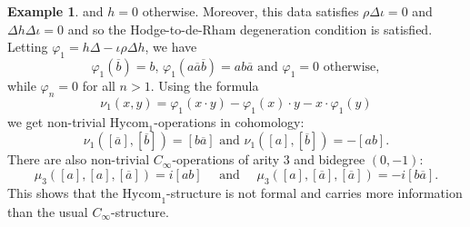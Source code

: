 \documentclass[a4paper]{amsart}
\theoremstyle{definition}
\newtheorem{exam}[theo]{Example}
\theoremstyle{theorem}
\newcommand{\ov}{\overline}
\newcommand{\Hycom}{{\mathrm{Hycom}}}
\begin{document}
\begin{exam}
 and $h=0$ otherwise.
Moreover, this data satisfies $\rho\Delta\iota=0$ and $\Delta h \Delta \iota=0$ and so the Hodge-to-de-Rham degeneration condition is satisfied.
Letting $\varphi_1=h\Delta-\iota\rho\Delta h$, we have
\[\varphi_1(\ov b)=b,\, \varphi_1(a\ov a\ov b)=ab\ov a\text{ and }\varphi_1=0\text{ otherwise},\]
while $\varphi_n=0$ for all $n>1$. Using the formula
\[\nu_1(x,y)=\varphi_1(x\cdot y)-\varphi_1(x)\cdot y-x\cdot \varphi_1(y)\]
we get non-trivial $\Hycom_1$-operations in cohomology:
\[\nu_1([\ov a],[\ov b])=[b\ov a]\text{ and }\nu_1([a],[\ov b])=-[ab].\]
There are also non-trivial $C_\infty$-operations of arity 3 and bidegree $(0,-1)$:
\[\mu_{3}([a],[a],[\ov a])=i[ab]\quad\text{ and }\quad\mu_3([a],[\ov a],[\ov a])=-i[b\ov a].\]
This shows that the $\Hycom_1$-structure is not formal and carries more information than the usual $C_\infty$-structure.
\end{exam}
























\end{document}
